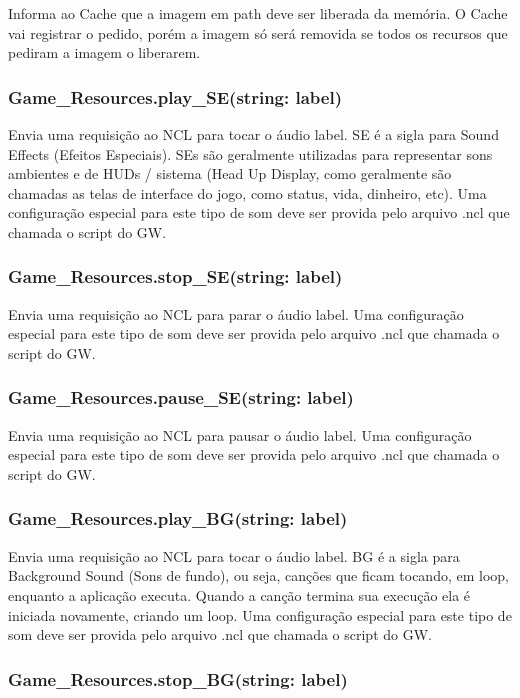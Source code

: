 \documentclass[
	12pt,				%
	openright,			%
	oneside,			%
	a4paper,			%
	brazil,				%
	]{abntex2}
\begin{document}
Informa ao Cache que a imagem em path deve ser liberada da memória. O Cache vai registrar o pedido, porém a imagem só será removida se todos os recursos que pediram a imagem o liberarem.

\subsubsection{Game\_Resources.play\_SE(string: label)}

Envia uma requisição ao NCL para tocar o áudio label. SE é a sigla para Sound Effects (Efeitos Especiais). SEs são geralmente utilizadas para representar sons ambientes e de HUDs / sistema (Head Up Display, como geralmente são chamadas as telas de interface do jogo, como status, vida, dinheiro, etc). Uma configuração especial para este tipo de som deve ser provida pelo arquivo .ncl que chamada o script do GW.

\subsubsection{Game\_Resources.stop\_SE(string: label)}

Envia uma requisição ao NCL para parar o áudio label. Uma configuração especial para este tipo de som deve ser provida pelo arquivo .ncl que chamada o script do GW.

\subsubsection{Game\_Resources.pause\_SE(string: label)}

Envia uma requisição ao NCL para pausar o áudio label. Uma configuração especial para este tipo de som deve ser provida pelo arquivo .ncl que chamada o script do GW.

\subsubsection{Game\_Resources.play\_BG(string: label)}

Envia uma requisição ao NCL para tocar o áudio label. BG é a sigla para Background Sound (Sons de fundo), ou seja, canções que ficam tocando, em loop, enquanto a aplicação executa. Quando a canção termina sua execução ela é iniciada novamente, criando um loop. Uma configuração especial para este tipo de som deve ser provida pelo arquivo .ncl que chamada o script do GW.

\subsubsection{Game\_Resources.stop\_BG(string: label)}
\end{document}
